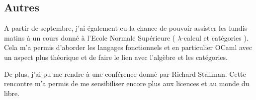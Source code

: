 \subsection*{Autres}

A partir de septembre, j'ai également eu la chance de pouvoir assister les
lundis matins à un cours donné à l'Ecole Normale Supérieure (\og
$\lambda$-calcul et catégories \fg). Cela m'a permis d'aborder les langages
fonctionnels et en particulier OCaml avec un aspect plus théorique et de faire
le lien avec l'algèbre et les catégories.

De plus, j'ai pu me rendre à une conférence donné par Richard Stallman. Cette
rencontre m'a permis de me sensibiliser encore plus aux licences et au monde du
libre.